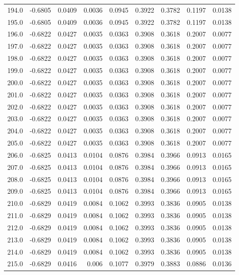 \begin{longtable}{lrrrrrrrr}
194.0 & -0.6805 & 0.0409 & 0.0036 & 0.0945 & 0.3922 & 0.3782 & 0.1197 & 0.0138 \\
195.0 & -0.6805 & 0.0409 & 0.0036 & 0.0945 & 0.3922 & 0.3782 & 0.1197 & 0.0138 \\
196.0 & -0.6822 & 0.0427 & 0.0035 & 0.0363 & 0.3908 & 0.3618 & 0.2007 & 0.0077 \\
197.0 & -0.6822 & 0.0427 & 0.0035 & 0.0363 & 0.3908 & 0.3618 & 0.2007 & 0.0077 \\
198.0 & -0.6822 & 0.0427 & 0.0035 & 0.0363 & 0.3908 & 0.3618 & 0.2007 & 0.0077 \\
199.0 & -0.6822 & 0.0427 & 0.0035 & 0.0363 & 0.3908 & 0.3618 & 0.2007 & 0.0077 \\
200.0 & -0.6822 & 0.0427 & 0.0035 & 0.0363 & 0.3908 & 0.3618 & 0.2007 & 0.0077 \\
201.0 & -0.6822 & 0.0427 & 0.0035 & 0.0363 & 0.3908 & 0.3618 & 0.2007 & 0.0077 \\
202.0 & -0.6822 & 0.0427 & 0.0035 & 0.0363 & 0.3908 & 0.3618 & 0.2007 & 0.0077 \\
203.0 & -0.6822 & 0.0427 & 0.0035 & 0.0363 & 0.3908 & 0.3618 & 0.2007 & 0.0077 \\
204.0 & -0.6822 & 0.0427 & 0.0035 & 0.0363 & 0.3908 & 0.3618 & 0.2007 & 0.0077 \\
205.0 & -0.6822 & 0.0427 & 0.0035 & 0.0363 & 0.3908 & 0.3618 & 0.2007 & 0.0077 \\
206.0 & -0.6825 & 0.0413 & 0.0104 & 0.0876 & 0.3984 & 0.3966 & 0.0913 & 0.0165 \\
207.0 & -0.6825 & 0.0413 & 0.0104 & 0.0876 & 0.3984 & 0.3966 & 0.0913 & 0.0165 \\
208.0 & -0.6825 & 0.0413 & 0.0104 & 0.0876 & 0.3984 & 0.3966 & 0.0913 & 0.0165 \\
209.0 & -0.6825 & 0.0413 & 0.0104 & 0.0876 & 0.3984 & 0.3966 & 0.0913 & 0.0165 \\
210.0 & -0.6829 & 0.0419 & 0.0084 & 0.1062 & 0.3993 & 0.3836 & 0.0905 & 0.0138 \\
211.0 & -0.6829 & 0.0419 & 0.0084 & 0.1062 & 0.3993 & 0.3836 & 0.0905 & 0.0138 \\
212.0 & -0.6829 & 0.0419 & 0.0084 & 0.1062 & 0.3993 & 0.3836 & 0.0905 & 0.0138 \\
213.0 & -0.6829 & 0.0419 & 0.0084 & 0.1062 & 0.3993 & 0.3836 & 0.0905 & 0.0138 \\
214.0 & -0.6829 & 0.0419 & 0.0084 & 0.1062 & 0.3993 & 0.3836 & 0.0905 & 0.0138 \\
215.0 & -0.6829 & 0.0416 & 0.006 & 0.1077 & 0.3979 & 0.3883 & 0.0886 & 0.0136 \\

\end{longtable}
